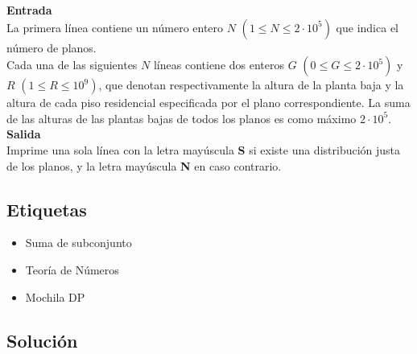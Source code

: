 \documentclass{article}
\begin{document}
\textbf{Entrada}\\

La primera línea contiene un número entero $N$ $(1\leq N\leq 2\cdot 10^5)$ que indica el número de planos.\\

Cada una de las siguientes $N$ líneas contiene dos enteros $G$ $(0\leq G\leq 2\cdot 10^5)$ y $R$ $(1\leq R\leq 10^9)$, que denotan respectivamente la altura de la planta baja y la altura de cada piso residencial especificada por el plano correspondiente. La suma de las alturas de las plantas bajas de todos los planos es como máximo $2\cdot 10^5$.\\

\textbf{Salida}\\

Imprime una sola línea con la letra mayúscula \textbf{S} si existe una distribución justa de los planos, y la letra mayúscula \textbf{N} en caso contrario.

\subsection{Etiquetas}

\begin{itemize}
    \item Suma de subconjunto
    \item Teoría de Números
    \item Mochila DP
\end{itemize}

\subsection{Solución}
\end{document}
